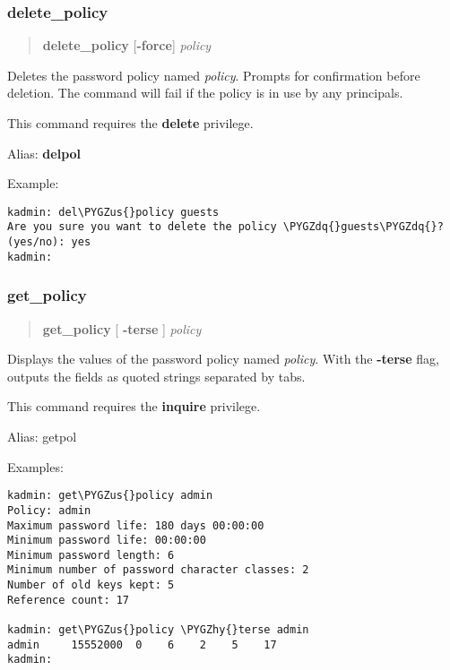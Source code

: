 \documentclass[letterpaper,10pt,english]{sphinxmanual}
\def\PYGZus{\char`\_}
\def\PYGZhy{\char`\-}
\def\PYGZdq{\char`\"}
\begin{document}
\subsubsection{delete\_policy}
\label{admin/admin_commands/kadmin_local:delete-policy}\label{admin/admin_commands/kadmin_local:modify-policy-end}\label{admin/admin_commands/kadmin_local:id14}\begin{quote}

\textbf{delete\_policy} {[}\textbf{-force}{]} \emph{policy}
\end{quote}

Deletes the password policy named \emph{policy}.  Prompts for confirmation
before deletion.  The command will fail if the policy is in use by any
principals.

This command requires the \textbf{delete} privilege.

Alias: \textbf{delpol}

Example:

\begin{Verbatim}[commandchars=\\\{\}]
kadmin: del\PYGZus{}policy guests
Are you sure you want to delete the policy \PYGZdq{}guests\PYGZdq{}?
(yes/no): yes
kadmin:
\end{Verbatim}
\label{admin/admin_commands/kadmin_local:delete-policy-end}

\subsubsection{get\_policy}
\label{admin/admin_commands/kadmin_local:delete-policy-end}\label{admin/admin_commands/kadmin_local:get-policy}\label{admin/admin_commands/kadmin_local:id15}\begin{quote}

\textbf{get\_policy} {[} \textbf{-terse} {]} \emph{policy}
\end{quote}

Displays the values of the password policy named \emph{policy}.  With the
\textbf{-terse} flag, outputs the fields as quoted strings separated by
tabs.

This command requires the \textbf{inquire} privilege.

Alias: getpol

Examples:

\begin{Verbatim}[commandchars=\\\{\}]
kadmin: get\PYGZus{}policy admin
Policy: admin
Maximum password life: 180 days 00:00:00
Minimum password life: 00:00:00
Minimum password length: 6
Minimum number of password character classes: 2
Number of old keys kept: 5
Reference count: 17

kadmin: get\PYGZus{}policy \PYGZhy{}terse admin
admin     15552000  0    6    2    5    17
kadmin:
\end{Verbatim}
\end{document}
